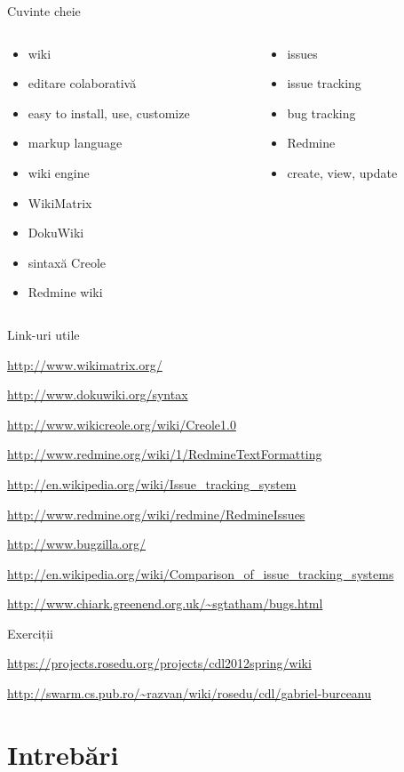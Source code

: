 \documentclass{beamer}
\begin{document}
\begin{frame}{Cuvinte cheie}
  \begin{columns}
    \begin{column}[l]{0.5\textwidth}
      \begin{itemize}
        \item wiki
        \item editare colaborativă
        \item easy to install, use, customize
        \item markup language
        \item wiki engine
        \item WikiMatrix
        \item DokuWiki
        \item sintaxă Creole
        \item Redmine wiki
      \end{itemize}
    \end{column}
    \begin{column}[l]{0.5\textwidth}
      \begin{itemize}
        \item issues
        \item issue tracking
        \item bug tracking
        \item Redmine
        \item create, view, update
      \end{itemize}
    \end{column}
  \end{columns}
\end{frame}

\begin{frame}{Link-uri utile}
  \begin{itemize}
    {\footnotesize
    \item \url{http://www.wikimatrix.org/}
    \item \url{http://www.dokuwiki.org/syntax}
    \item \url{http://www.wikicreole.org/wiki/Creole1.0}
    \item \url{http://www.redmine.org/wiki/1/RedmineTextFormatting}
    \item \url{http://en.wikipedia.org/wiki/Issue\_tracking\_system}
    \item \url{http://www.redmine.org/wiki/redmine/RedmineIssues}
    \item \url{http://www.bugzilla.org/}
    \item
\url{http://en.wikipedia.org/wiki/Comparison\_of\_issue\_tracking\_systems}
    \item \url{http://www.chiark.greenend.org.uk/~sgtatham/bugs.html}
    }
  \end{itemize}
\end{frame}

\begin{frame}{Exerciții}
  \begin{itemize}
    {\small
    \item \url{https://projects.rosedu.org/projects/cdl2012spring/wiki}
    \item
      \url{http://swarm.cs.pub.ro/~razvan/wiki/rosedu/cdl/gabriel-burceanu}
    }
  \end{itemize}
\end{frame}

\section{Intrebări}
\end{document}
